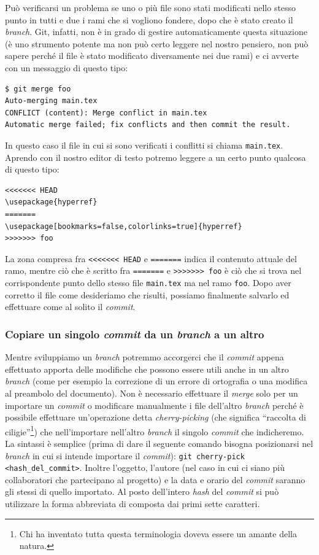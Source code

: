 \documentclass[a4paper,12pt,oneside]{article}
\begin{document}
Può verificarsi un problema se uno o più file sono stati modificati nello stesso
punto in tutti e due i rami che si vogliono fondere, dopo che è stato creato il
\emph{branch}. Git, infatti, non è in grado di gestire automaticamente questa
situazione (è uno strumento potente ma non può certo leggere nel nostro pensiero,
non può sapere perché il file è stato modificato diversamente nei due rami) e ci
avverte con un messaggio di questo tipo:
\begin{lstlisting}[language={}]
$ git merge foo
Auto-merging main.tex
CONFLICT (content): Merge conflict in main.tex
Automatic merge failed; fix conflicts and then commit the result.
\end{lstlisting}
In questo caso il file in cui si sono verificati i conflitti si chiama
\lstinline|main.tex|. Aprendo con il nostro editor di testo potremo leggere
a un certo punto qualcosa di questo tipo:
\begin{lstlisting}[language={},emph={HEAD,foo}]
<<<<<<< HEAD
\usepackage{hyperref}
=======
\usepackage[bookmarks=false,colorlinks=true]{hyperref}
>>>>>>> foo
\end{lstlisting}
La zona compresa fra \lstinline|<<<<<<< HEAD| e \lstinline|=======| indica il
contenuto attuale del ramo, mentre ciò che è scritto fra \lstinline|=======| e
\lstinline|>>>>>>> foo| è ciò che si trova nel corrispondente punto dello stesso
file \lstinline|main.tex| ma nel ramo \lstinline|foo|. Dopo aver corretto il file
come desideriamo che risulti, possiamo finalmente salvarlo ed effettuare come al
solito il \emph{commit}.

\subsubsection{Copiare un singolo \emph{commit} da un \emph{branch} a un altro}
Mentre sviluppiamo un \emph{branch} potremmo accorgerci che il \emph{commit} appena
effettuato apporta delle modifiche che possono essere utili anche in un altro
\emph{branch} (come per esempio la correzione di un errore di ortografia o una
modifica al preambolo del documento). Non è necessario effettuare il \emph{merge}
solo per un importare un \emph{commit} o modificare manualmente i file dell'altro
\emph{branch} perché è possibile effettuare un'operazione detta
\emph{cherry-picking} (che significa ``raccolta di ciligie''\footnote{Chi ha
  inventato tutta questa terminologia doveva essere un amante della natura.}) che
nell'importare nell'altro \emph{branch} il singolo \emph{commit} che
indicheremo. La sintassi è semplice (prima di dare il seguente comando bisogna
posizionarsi nel \emph{branch} in cui si intende importare il \emph{commit}):
\lstinline|git cherry-pick <hash_del_commit>|. Inoltre l'oggetto, l'autore (nel
caso in cui ci siano più collaboratori che partecipano al progetto) e la data e
orario del \emph{commit} saranno gli stessi di quello importato. Al posto
dell'intero \emph{hash} del \emph{commit} si può utilizzare la forma abbreviata
di composta dai primi sette caratteri.
\end{document}
